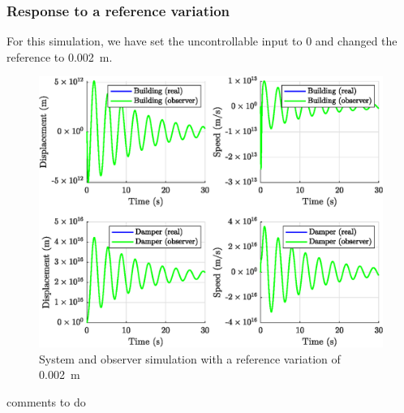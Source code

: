 \subsubsection{Response to a reference variation}
For this simulation, we have set the uncontrollable input to 0 and changed the reference to \SI{0.002}{\meter}.
\begin{figure}[H]
    \centering
    \includegraphics[width=\textwidth]{resources/eps/observer-reference.eps}
    \caption{System and observer simulation with a reference variation of \SI{0.002}{\meter}}
\end{figure}
comments to do


